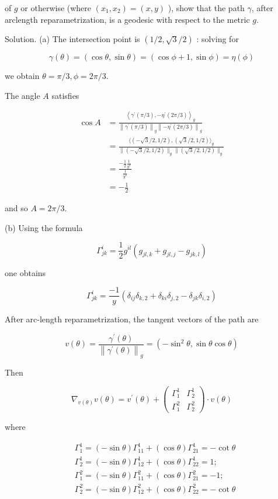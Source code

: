 \documentclass[10pt]{article}
\begin{document}
of $g$ or otherwise (where $\left(x_{1}, x_{2}\right)=(x, y)$ ), show that the path $\gamma$, after arclength reparametrization, is a geodesic with respect to the metric $g$.

Solution. (a) The intersection point is $(1 / 2, \sqrt{3} / 2)$ : solving for

$$
\gamma(\theta)=(\cos \theta, \sin \theta)=(\cos \phi+1, \sin \phi)=\eta(\phi)
$$

we obtain $\theta=\pi / 3, \phi=2 \pi / 3$.

The angle $A$ satisfies

$$
\begin{aligned}
\cos A & =\frac{\left\langle\gamma^{\prime}(\pi / 3),-\eta^{\prime}(2 \pi / 3)\right\rangle_{g}}{\left\|\gamma^{\prime}(\pi / 3)\right\|_{g}\left\|-\eta^{\prime}(2 \pi / 3)\right\|_{g}} \\
& =\frac{\langle(-\sqrt{3} / 2,1 / 2),(\sqrt{3} / 2,1 / 2)\rangle_{g}}{\|(-\sqrt{3} / 2,1 / 2)\|_{g}\|(\sqrt{3} / 2,1 / 2)\|_{g}} \\
& =\frac{-\frac{1}{2} \frac{1}{y^{2}}}{\frac{1}{y^{2}}} \\
& =-\frac{1}{2}
\end{aligned}
$$

and so $A=2 \pi / 3$.

(b) Using the formula

$$
\Gamma_{j k}^{i}=\frac{1}{2} g^{i l}\left(g_{j l, k}+g_{j l, j}-g_{j k, l}\right)
$$

one obtains

$$
\Gamma_{j k}^{i}=\frac{-1}{y}\left(\delta_{i j} \delta_{k, 2}+\delta_{k i} \delta_{j, 2}-\delta_{j k} \delta_{i, 2}\right)
$$

After arc-length reparametrization, the tangent vectors of the path are

$$
v(\theta)=\frac{\gamma^{\prime}(\theta)}{\left\|\gamma^{\prime}(\theta)\right\|_{g}}=\left(-\sin ^{2} \theta, \sin \theta \cos \theta\right)
$$

Then

$$
\nabla_{v(\theta)} v(\theta)=v^{\prime}(\theta)+\left(\begin{array}{cc}
\Gamma_{1}^{1} & \Gamma_{2}^{1} \\
\Gamma_{1}^{2} & \Gamma_{2}^{2}
\end{array}\right) \cdot v(\theta)
$$

where

$$
\begin{aligned}
& \Gamma_{1}^{1}=(-\sin \theta) \Gamma_{11}^{1}+(\cos \theta) \Gamma_{21}^{1}=-\cot \theta \\
& \Gamma_{2}^{1}=(-\sin \theta) \Gamma_{12}^{1}+(\cos \theta) \Gamma_{22}^{1}=1 ; \\
& \Gamma_{1}^{2}=(-\sin \theta) \Gamma_{11}^{2}+(\cos \theta) \Gamma_{21}^{2}=-1 ; \\
& \Gamma_{2}^{2}=(-\sin \theta) \Gamma_{12}^{2}+(\cos \theta) \Gamma_{22}^{2}=-\cot \theta
\end{aligned}
$$
\end{document}
